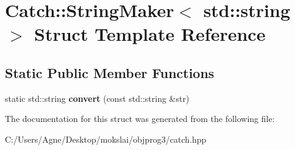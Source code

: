 \hypertarget{struct_catch_1_1_string_maker_3_01std_1_1string_01_4}{}\section{Catch\+:\+:String\+Maker$<$ std\+:\+:string $>$ Struct Template Reference}
\label{struct_catch_1_1_string_maker_3_01std_1_1string_01_4}
\subsection*{Static Public Member Functions}
\begin{DoxyCompactItemize}
\item 
\mbox{\label{struct_catch_1_1_string_maker_3_01std_1_1string_01_4_ae065b2ecc5c1a6c4409cf06d604bd66d}} 
static std\+::string {\bfseries convert} (const std\+::string \&str)
\end{DoxyCompactItemize}


The documentation for this struct was generated from the following file\+:\begin{DoxyCompactItemize}
\item 
C\+:/\+Users/\+Agne/\+Desktop/mokslai/objprog3/catch.\+hpp\end{DoxyCompactItemize}
